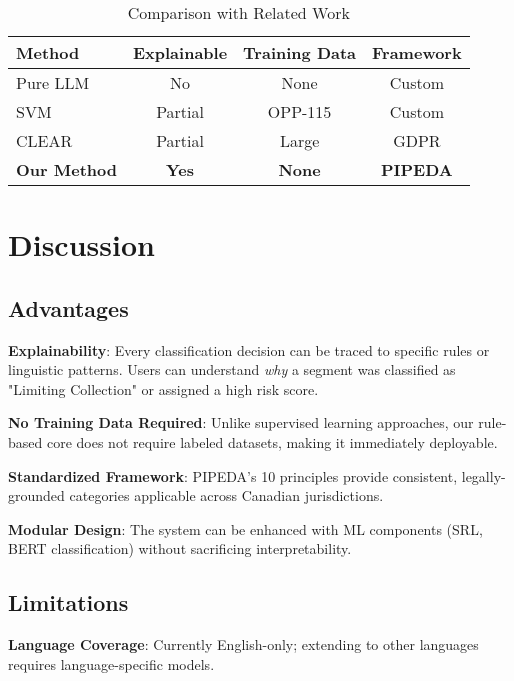\documentclass[conference]{IEEEtran}
\begin{document}
\begin{table}[htbp]
\caption{Comparison with Related Work}
\begin{center}
\begin{tabular}{|l|c|c|c|}
\hline
\textbf{Method} & \textbf{Explainable} & \textbf{Training Data} & \textbf{Framework} \\
\hline
Pure LLM \cite{llm-assessment} & No & None & Custom \\
\hline
SVM \cite{systematic-review} & Partial & OPP-115 & Custom \\
\hline
CLEAR \cite{clear} & Partial & Large & GDPR \\
\hline
\textbf{Our Method} & \textbf{Yes} & \textbf{None} & \textbf{PIPEDA} \\
\hline
\end{tabular}
\label{tab:comparison}
\end{center}
\end{table}

\section{Discussion}

\subsection{Advantages}

\textbf{Explainability}: Every classification decision can be traced to specific rules or linguistic patterns. Users can understand \textit{why} a segment was classified as "Limiting Collection" or assigned a high risk score.

\textbf{No Training Data Required}: Unlike supervised learning approaches, our rule-based core does not require labeled datasets, making it immediately deployable.

\textbf{Standardized Framework}: PIPEDA's 10 principles provide consistent, legally-grounded categories applicable across Canadian jurisdictions.

\textbf{Modular Design}: The system can be enhanced with ML components (SRL, BERT classification) without sacrificing interpretability.

\subsection{Limitations}

\textbf{Language Coverage}: Currently English-only; extending to other languages requires language-specific models.
\end{document}
